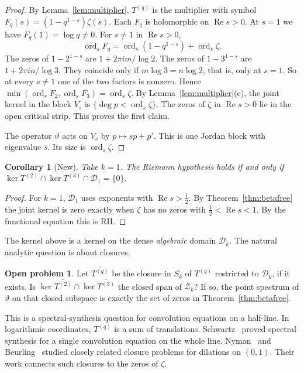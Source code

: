\documentclass[12pt,letterpaper]{article}
\newtheorem{corollary}[theorem]{Corollary}
\theoremstyle{definition}
\newtheorem{problem}[theorem]{Open problem}
\theoremstyle{remark}
\newcommand{\Ree}{\operatorname{Re}}
\newcommand{\Dk}{\mathcal{D}_k}
\newcommand{\kerop}{\operatorname{ker}}
\newcommand{\ord}{\operatorname{ord}}
\newcommand{\yD}{\vartheta}
\begin{document}
\begin{proof}
By Lemma~\ref{lem:multiplier}, $T^{(q)}$ is the multiplier with symbol
$F_q(s)=(1-q^{1-s})\zeta(s)$. Each $F_q$ is holomorphic on $\Ree s>0$. At
$s=1$ we have $F_q(1)=\log q\ne0$. For $s\ne1$ in $\Ree s>0$,
\[
\ord_sF_q=\ord_s(1-q^{1-s})+\ord_s\zeta.
\]
The zeros of $1-2^{1-s}$ are $1+2\pi im/\log2$. The zeros of $1-3^{1-s}$
are $1+2\pi in/\log3$. They coincide only if $m\log3=n\log2$, that is,
only at $s=1$. So at every $s\ne1$ one of the two factors is nonzero. Hence
$\min(\ord_sF_2,\ord_sF_3)=\ord_s\zeta$. By Lemma~\ref{lem:multiplier}(c),
the joint kernel in the block $V_s$ is $\{\deg p<\ord_s\zeta\}$. The zeros
of $\zeta$ in $\Ree s>0$ lie in the open critical strip. This proves the
first claim.

The operator $\yD$ acts on $V_s$ by $p\mapsto sp+p'$. This is one Jordan
block with eigenvalue $s$. Its size is $\ord_s\zeta$.
\end{proof}

\begin{corollary}[New]
Take $k=1$. The Riemann hypothesis holds if and only if
$\kerop T^{(2)}\cap\kerop T^{(3)}\cap\mathcal D_1=\{0\}$.
\end{corollary}

\begin{proof}
For $k=1$, $\mathcal D_1$ uses exponents with $\Ree s>\frac12$. By
Theorem~\ref{thm:betafree} the joint kernel is zero exactly when $\zeta$ has
no zeros with $\frac12<\Ree s<1$. By the functional equation this is RH.
\end{proof}

The kernel above is a kernel on the dense \emph{algebraic} domain $\Dk$.
The natural analytic question is about closures.

\begin{problem}\label{prob:synthesis}
Let $\overline{T^{(q)}}$ be the closure in $S_k$ of $T^{(q)}$ restricted to
$\Dk$, if it exists. Is $\kerop\overline{T^{(2)}}\cap\kerop\overline{T^{(3)}}$
the closed span of $\mathcal Z_k$? If so, the point spectrum of $\yD$ on
that closed subspace is exactly the set of zeros in
Theorem~\ref{thm:betafree}.
\end{problem}

This is a spectral-synthesis question for convolution equations on a
half-line. In logarithmic coordinates, $T^{(q)}$ is a sum of translations.
Schwartz~\cite{Sc47} proved spectral synthesis for a single convolution
equation on the whole line. Nyman~\cite{Ny50} and Beurling~\cite{Be55}
studied closely related closure problems for dilations on $(0,1)$. Their
work connects such closures to the zeros of $\zeta$.
\end{document}
